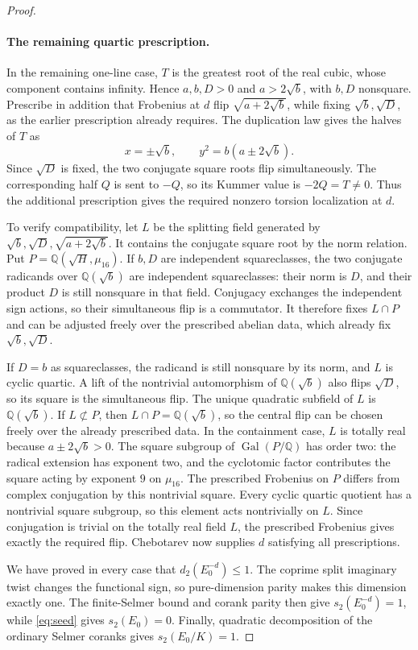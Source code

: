 \begin{proof}
\paragraph{The remaining quartic prescription.}
In the remaining one-line case, \(T\) is the greatest root of the real
cubic, whose component contains infinity.  Hence \(a,b,D>0\) and
\(a>2\sqrt b\), with
\(b,D\) nonsquare.  Prescribe in addition that Frobenius at \(d\) flip
\(\sqrt{a+2\sqrt b}\), while fixing \(\sqrt b,\sqrt D\), as the earlier
prescription already requires.  The duplication law gives the halves
of \(T\) as
\[
 x=\pm\sqrt b,\qquad y^2=b(a\pm2\sqrt b).
\]
Since \(\sqrt D\) is fixed, the two conjugate square roots flip
simultaneously.  The corresponding half \(Q\) is sent to \(-Q\), so
its Kummer value is \(-2Q=T\ne0\).  Thus the additional prescription
gives the required nonzero torsion localization at \(d\).

To verify compatibility, let \(L\) be the splitting field generated by
\(\sqrt b,\sqrt D,\sqrt{a+2\sqrt b}\).  It contains the conjugate square
root by the norm relation.  Put \(P=\mathbb Q(\sqrt H,\mu_{16})\).
If \(b,D\) are independent squareclasses,
the two conjugate radicands over \(\mathbb Q(\sqrt b)\) are independent
squareclasses: their norm is \(D\), and their product \(D\) is still
nonsquare in that field.  Conjugacy exchanges the independent sign
actions, so their simultaneous flip is a commutator.  It therefore fixes
\(L\cap P\) and can be adjusted freely over
the prescribed abelian data, which already fix \(\sqrt b,\sqrt D\).

If \(D=b\) as squareclasses, the radicand is still nonsquare by its norm,
and \(L\) is cyclic quartic.  A lift of the nontrivial automorphism of
\(\mathbb Q(\sqrt b)\) also flips \(\sqrt D\), so its square is the
simultaneous flip.  The unique quadratic subfield of \(L\) is
\(\mathbb Q(\sqrt b)\).
If \(L\not\subset P\), then \(L\cap P=\mathbb Q(\sqrt b)\), so the
central flip can be chosen freely over the already prescribed data.
In the containment case, \(L\) is totally real because
\(a\pm2\sqrt b>0\).  The square subgroup of
\(\operatorname{Gal}(P/\mathbb Q)\) has order two: the radical extension
has exponent two, and the cyclotomic factor contributes the square
acting by exponent \(9\) on \(\mu_{16}\).  The prescribed Frobenius on
\(P\) differs from complex conjugation by this nontrivial square.
Every cyclic quartic quotient has a nontrivial square subgroup, so this
element acts nontrivially on \(L\).  Since conjugation is trivial on the
totally real field \(L\), the prescribed Frobenius gives exactly the
required flip.  Chebotarev now supplies \(d\) satisfying all prescriptions.

We have proved in every case that \(d_2(E_0^{-d})\le1\).  The coprime
split imaginary twist changes the functional sign, so pure-dimension
parity makes this dimension exactly one.  The finite-Selmer bound and
corank parity then give \(s_2(E_0^{-d})=1\), while \eqref{eq:seed} gives
\(s_2(E_0)=0\).  Finally, quadratic decomposition of the ordinary Selmer
coranks gives \(s_2(E_0/K)=1\).
\end{proof}

